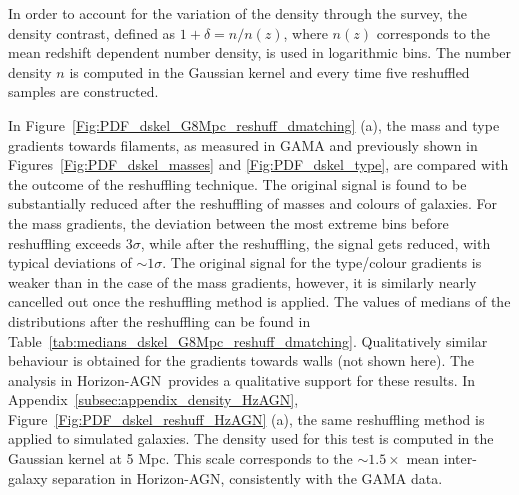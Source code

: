 \documentclass[useAMS,usenatbib]{mnras}
\newcommand{\hagn}{\mbox{{\sc \small Horizon-AGN}}}
\begin{document}
In order to account for the variation of the density through the survey, the density contrast, defined as $1 + \delta = n/ n(z)$, where $n(z)$ corresponds to the mean redshift dependent number density, is used in logarithmic bins. The number density $n$ is computed in the Gaussian kernel and
every time five reshuffled samples are constructed.


In Figure~\ref{Fig:PDF_dskel_G8Mpc_reshuff_dmatching} (a), the mass and type gradients towards filaments, as measured in GAMA and previously shown in Figures~\ref{Fig:PDF_dskel_masses} and \ref{Fig:PDF_dskel_type}, are compared with the outcome of the reshuffling technique. The original signal is found to be substantially reduced after the reshuffling of masses and colours of galaxies. For the mass gradients, the deviation between the most extreme bins before reshuffling exceeds $3 \sigma$, while after the reshuffling, the signal gets reduced, with typical deviations of $\sim 1 \sigma$. The original signal for the type/colour gradients is weaker than in the case of the mass gradients, however, it is similarly nearly cancelled out once the reshuffling method is applied. 
The values of medians of the distributions after the reshuffling can be found in Table~\ref{tab:medians_dskel_G8Mpc_reshuff_dmatching}. Qualitatively similar behaviour is obtained for the gradients towards walls (not shown here).   
The analysis in \hagn\, provides a qualitative support for these results. In Appendix~\ref{subsec:appendix_density_HzAGN}, Figure~\ref{Fig:PDF_dskel_reshuff_HzAGN} (a), the same reshuffling method is applied to simulated galaxies. The density used for this test is computed in the Gaussian kernel at 5 Mpc. This scale corresponds to the $\sim 1.5 \times$ mean inter-galaxy separation in \hagn, consistently with the GAMA data.
\end{document}
